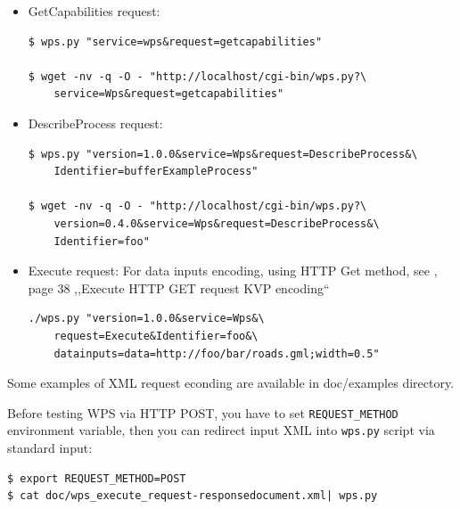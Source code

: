 \documentclass[a4paper,11pt]{report}
\begin{document}
\begin{itemize}
    \item GetCapabilities request:
\begin{verbatim}
$ wps.py "service=wps&request=getcapabilities"

$ wget -nv -q -O - "http://localhost/cgi-bin/wps.py?\
    service=Wps&request=getcapabilities"
\end{verbatim}
        
    \item DescribeProcess request:
\begin{verbatim}
$ wps.py "version=1.0.0&service=Wps&request=DescribeProcess&\
    Identifier=bufferExampleProcess"

$ wget -nv -q -O - "http://localhost/cgi-bin/wps.py?\
    version=0.4.0&service=Wps&request=DescribeProcess&\
    Identifier=foo"
\end{verbatim}
        
    \item Execute request:
            For data inputs encoding, using HTTP Get method, see
            \pywpsDocCurrent, page 38 ,,Execute HTTP GET request KVP
            encoding``
\begin{verbatim}
./wps.py "version=1.0.0&service=Wps&\
    request=Execute&Identifier=foo&\
    datainputs=data=http://foo/bar/roads.gml;width=0.5"
\end{verbatim}
        
\end{itemize}


Some examples of XML request econding are available in doc/examples
directory.

Before testing WPS via HTTP POST, you have to set \texttt{REQUEST\_METHOD}
environment variable, then you can redirect input XML into \texttt{wps.py}
script via standard input:

\begin{verbatim}
$ export REQUEST_METHOD=POST
$ cat doc/wps_execute_request-responsedocument.xml| wps.py
\end{verbatim}
\end{document}
